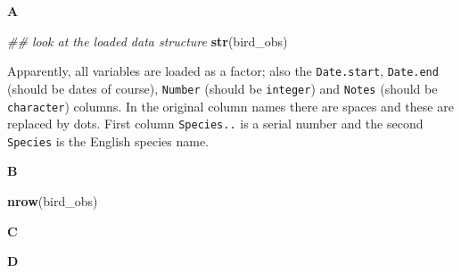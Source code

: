 \documentclass[]{book}
\newenvironment{Shaded}{\begin{snugshade}}{\end{snugshade}}
\newcommand{\CommentTok}[1]{\textcolor[rgb]{0.56,0.35,0.01}{\textit{#1}}}
\newcommand{\DataTypeTok}[1]{\textcolor[rgb]{0.13,0.29,0.53}{#1}}
\newcommand{\DecValTok}[1]{\textcolor[rgb]{0.00,0.00,0.81}{#1}}
\newcommand{\KeywordTok}[1]{\textcolor[rgb]{0.13,0.29,0.53}{\textbf{#1}}}
\newcommand{\NormalTok}[1]{#1}
\newcommand{\OperatorTok}[1]{\textcolor[rgb]{0.81,0.36,0.00}{\textbf{#1}}}
\newcommand{\StringTok}[1]{\textcolor[rgb]{0.31,0.60,0.02}{#1}}
\begin{document}
\textbf{A}

\begin{Shaded}
\begin{Highlighting}[]
\CommentTok{## look at the loaded data structure}
\KeywordTok{str}\NormalTok{(bird_obs)}
\end{Highlighting}
\end{Shaded}

Apparently, all variables are loaded as a factor; also the \texttt{Date.start}, \texttt{Date.end} (should be dates of course), \texttt{Number} (should be \texttt{integer}) and \texttt{Notes} (should be \texttt{character}) columns. In the original column names there are spaces and these are replaced by dots. First column \texttt{Species..} is a serial number and the second \texttt{Species} is the English species name.

\textbf{B}

\begin{Shaded}
\begin{Highlighting}[]
\KeywordTok{nrow}\NormalTok{(bird_obs)}
\end{Highlighting}
\end{Shaded}

\textbf{C}

\begin{Shaded}
\end{Shaded}

\textbf{D}

\begin{Shaded}
\end{Shaded}
\end{document}

